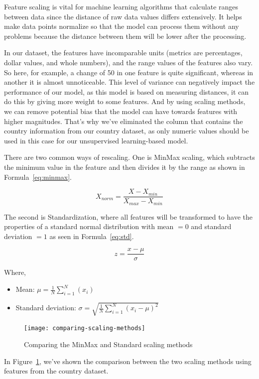 \documentclass{swfuthesise}
\begin{document}
Feature scaling is vital for machine learning algorithms that calculate ranges between data since the distance of raw data values differs extensively. It helps make data points normalize so that the model can process them without any problems because the distance between them will be lower after the processing.

In our dataset, the features have incomparable units (metrics are percentages, dollar
values, and whole numbers), and the range values of the features also vary. So here, for
example, a change of 50 in one feature is quite significant, whereas in another it is
almost unnoticeable. This level of variance can negatively impact the performance of our
model, as this model is based on measuring distances, it can do this by giving more weight
to some features. And by using scaling methods, we can remove potential bias that the
model can have towards features with higher magnitudes. That's why we’ve eliminated the
column that contains the country information from our country dataset, as only numeric
values should be used in this case for our unsupervised learning-based model.

There are two common ways of rescaling. One is MinMax scaling, which subtracts the minimum
value in the feature and then divides it by the range as shown in Formula~\eqref{eq:minmax}.

\begin{equation}\label{eq:minmax}
X_{norm} = \frac{X - X_{min}}{X_{max}-X_{min}}
\end{equation}

The second is Standardization, where all features will be transformed to have the
properties of a standard normal distribution with mean \(=0\) and standard deviation
\(=1\) as seen in Formula~\eqref{eq:std}.

\begin{equation}\label{eq:std}
z = \frac{x - \mu}{\sigma}
\end{equation}

Where,
\begin{itemize}
\item[] Mean: \( \mu = \frac{1}{N} \sum_{i=1}^N (x_i)\)
\item[] Standard deviation: \(\sigma = \sqrt{\frac{1}{N} \sum_{i=1}^N (x_i - \mu)^2}\)
\end{itemize}


\begin{figure}[!htp]
    \centering
    \texttt{[image: comparing-scaling-methods]}
    \caption{Comparing the MinMax and Standard scaling methods}
    \label{fig:scaling}
\end{figure} 
In Figure~\ref{fig:scaling}, we've shown the comparison between the two scaling methods using features from the country dataset.
\end{document}
